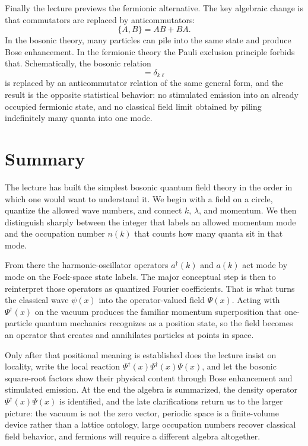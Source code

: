 Finally the lecture previews the fermionic alternative. The key algebraic change is that commutators are replaced by anticommutators:
\begin{equation}
\{A,B\}=AB+BA.
\end{equation}
In the bosonic theory, many particles can pile into the same state and produce Bose enhancement. In the fermionic theory the Pauli exclusion principle forbids that. Schematically, the bosonic relation
\begin{equation}
[a(k),a^\dagger(\ell)]=\delta_{k\ell}
\end{equation}
is replaced by an anticommutator relation of the same general form, and the result is the opposite statistical behavior: no stimulated emission into an already occupied fermionic state, and no classical field limit obtained by piling indefinitely many quanta into one mode.

\section{Summary}

The lecture has built the simplest bosonic quantum field theory in the order in which one would want to understand it. We begin with a field on a circle, quantize the allowed wave numbers, and connect \(k\), \(\lambda\), and momentum. We then distinguish sharply between the integer that labels an allowed momentum mode and the occupation number \(n(k)\) that counts how many quanta sit in that mode.

From there the harmonic-oscillator operators \(a^\dagger(k)\) and \(a(k)\) act mode by mode on the Fock-space state labels. The major conceptual step is then to reinterpret those operators as quantized Fourier coefficients. That is what turns the classical wave \(\psi(x)\) into the operator-valued field \(\Psi(x)\). Acting with \(\Psi^\dagger(x)\) on the vacuum produces the familiar momentum superposition that one-particle quantum mechanics recognizes as a position state, so the field becomes an operator that creates and annihilates particles at points in space.

Only after that positional meaning is established does the lecture insist on locality, write the local reaction \(\Psi^\dagger(x)\Psi^\dagger(x)\Psi(x)\), and let the bosonic square-root factors show their physical content through Bose enhancement and stimulated emission. At the end the algebra is summarized, the density operator \(\Psi^\dagger(x)\Psi(x)\) is identified, and the late clarifications return us to the larger picture: the vacuum is not the zero vector, periodic space is a finite-volume device rather than a lattice ontology, large occupation numbers recover classical field behavior, and fermions will require a different algebra altogether.